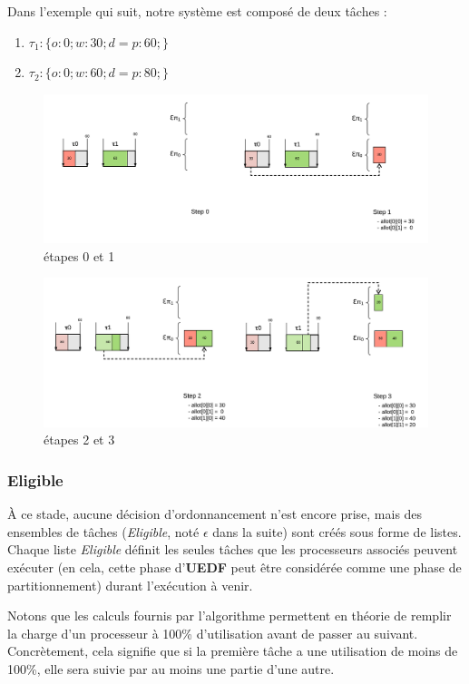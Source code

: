 	Dans l'exemple qui suit, notre système est composé de deux tâches :
	\begin{enumerate}
		\setlength\itemsep{0.1em}
		\item $\tau_1 : \{o:0; w:30; d=p:60;\}$
		\item $\tau_2 : \{o:0; w:60; d=p:80;\}$
	\end{enumerate}
	\begin{figure}[H]
		\includegraphics[scale=1]{img/uedf/uedf12}
		\caption{étapes 0 et 1}
	\end{figure}
	\begin{figure}[H]
		\includegraphics[scale=1]{img/uedf/uedf34}
		\caption{étapes 2 et 3}
	\end{figure}
	\subsubsection{Eligible}
	À ce stade, aucune décision d'ordonnancement n'est encore prise, mais des ensembles de tâches (\textit{Eligible}, 
	noté $\epsilon$ dans la suite) sont créés sous forme de listes. Chaque liste \textit{Eligible} définit 
	les seules tâches que les processeurs associés peuvent exécuter (en cela, cette phase d'\textbf{UEDF} peut 
	être considérée comme une phase de partitionnement) durant l'exécution à venir.\newline
	
	Notons que les calculs fournis par l'algorithme permettent en théorie de \og{}remplir\fg{} 
	la charge d'un processeur à 100\% d'utilisation avant de passer au suivant. Concrètement, 
	cela signifie que si la première tâche a une utilisation de moins de 100\%, elle sera suivie par 
	au moins une partie d'une autre.\newline
	
